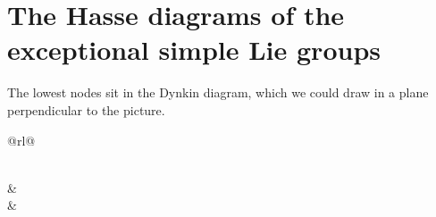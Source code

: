 \documentclass[a4paper,10pt]{amsart}
\theoremstyle{remark}
\begin{document}
\endgroup
\newpage
\section{The Hasse diagrams of the exceptional simple Lie groups}%
\label{sec:excep.Hasses}%
The lowest nodes sit in the Dynkin diagram, which we could draw in a plane perpendicular to the picture.
\makeatletter%
\lie@hasse@multiple@diagramsfalse%
\tikzset{/Lie Hasse diagram,show name=true,ordering=Carter}%
\tikzset{/Dynkin diagram/ordering=Carter}%
\begin{longtable}{@{}rl@{}}%
\caption{Exceptional Hasse diagrams}\label{table:exceptionals}\\
&\\
&\\
\end{longtable}
\makeatother
\newpage
\end{document}
